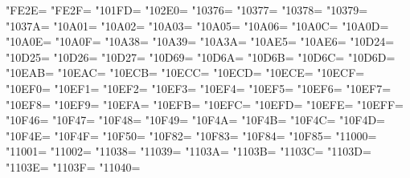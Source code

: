 \XeTeXcharclass"FE2E=\KclassCM
\XeTeXcharclass"FE2F=\KclassCM
\XeTeXcharclass"101FD=\KclassCM
\XeTeXcharclass"102E0=\KclassCM
\XeTeXcharclass"10376=\KclassCM
\XeTeXcharclass"10377=\KclassCM
\XeTeXcharclass"10378=\KclassCM
\XeTeXcharclass"10379=\KclassCM
\XeTeXcharclass"1037A=\KclassCM
\XeTeXcharclass"10A01=\KclassCM
\XeTeXcharclass"10A02=\KclassCM
\XeTeXcharclass"10A03=\KclassCM
\XeTeXcharclass"10A05=\KclassCM
\XeTeXcharclass"10A06=\KclassCM
\XeTeXcharclass"10A0C=\KclassCM
\XeTeXcharclass"10A0D=\KclassCM
\XeTeXcharclass"10A0E=\KclassCM
\XeTeXcharclass"10A0F=\KclassCM
\XeTeXcharclass"10A38=\KclassCM
\XeTeXcharclass"10A39=\KclassCM
\XeTeXcharclass"10A3A=\KclassCM
\XeTeXcharclass"10AE5=\KclassCM
\XeTeXcharclass"10AE6=\KclassCM
\XeTeXcharclass"10D24=\KclassCM
\XeTeXcharclass"10D25=\KclassCM
\XeTeXcharclass"10D26=\KclassCM
\XeTeXcharclass"10D27=\KclassCM
\XeTeXcharclass"10D69=\KclassCM
\XeTeXcharclass"10D6A=\KclassCM
\XeTeXcharclass"10D6B=\KclassCM
\XeTeXcharclass"10D6C=\KclassCM
\XeTeXcharclass"10D6D=\KclassCM
\XeTeXcharclass"10EAB=\KclassCM
\XeTeXcharclass"10EAC=\KclassCM
\XeTeXcharclass"10ECB=\KclassCM
\XeTeXcharclass"10ECC=\KclassCM
\XeTeXcharclass"10ECD=\KclassCM
\XeTeXcharclass"10ECE=\KclassCM
\XeTeXcharclass"10ECF=\KclassCM
\XeTeXcharclass"10EF0=\KclassCM
\XeTeXcharclass"10EF1=\KclassCM
\XeTeXcharclass"10EF2=\KclassCM
\XeTeXcharclass"10EF3=\KclassCM
\XeTeXcharclass"10EF4=\KclassCM
\XeTeXcharclass"10EF5=\KclassCM
\XeTeXcharclass"10EF6=\KclassCM
\XeTeXcharclass"10EF7=\KclassCM
\XeTeXcharclass"10EF8=\KclassCM
\XeTeXcharclass"10EF9=\KclassCM
\XeTeXcharclass"10EFA=\KclassCM
\XeTeXcharclass"10EFB=\KclassCM
\XeTeXcharclass"10EFC=\KclassCM
\XeTeXcharclass"10EFD=\KclassCM
\XeTeXcharclass"10EFE=\KclassCM
\XeTeXcharclass"10EFF=\KclassCM
\XeTeXcharclass"10F46=\KclassCM
\XeTeXcharclass"10F47=\KclassCM
\XeTeXcharclass"10F48=\KclassCM
\XeTeXcharclass"10F49=\KclassCM
\XeTeXcharclass"10F4A=\KclassCM
\XeTeXcharclass"10F4B=\KclassCM
\XeTeXcharclass"10F4C=\KclassCM
\XeTeXcharclass"10F4D=\KclassCM
\XeTeXcharclass"10F4E=\KclassCM
\XeTeXcharclass"10F4F=\KclassCM
\XeTeXcharclass"10F50=\KclassCM
\XeTeXcharclass"10F82=\KclassCM
\XeTeXcharclass"10F83=\KclassCM
\XeTeXcharclass"10F84=\KclassCM
\XeTeXcharclass"10F85=\KclassCM
\XeTeXcharclass"11000=\KclassCM
\XeTeXcharclass"11001=\KclassCM
\XeTeXcharclass"11002=\KclassCM
\XeTeXcharclass"11038=\KclassCM
\XeTeXcharclass"11039=\KclassCM
\XeTeXcharclass"1103A=\KclassCM
\XeTeXcharclass"1103B=\KclassCM
\XeTeXcharclass"1103C=\KclassCM
\XeTeXcharclass"1103D=\KclassCM
\XeTeXcharclass"1103E=\KclassCM
\XeTeXcharclass"1103F=\KclassCM
\XeTeXcharclass"11040=\KclassCM
